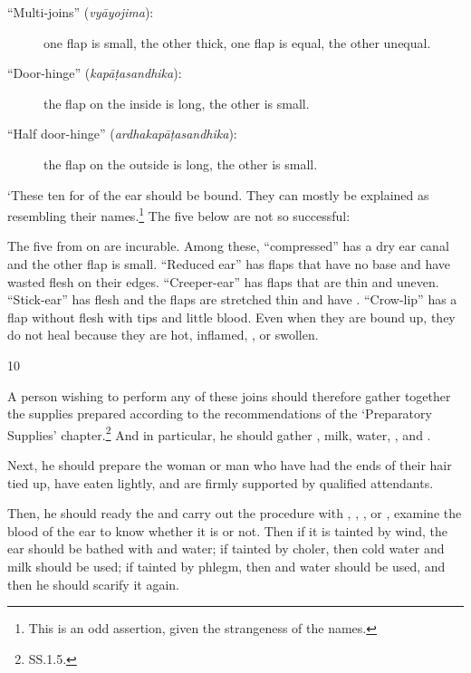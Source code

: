 \begin{translation}
\begin{description}
        \item[\mdseries``Multi-joins'' (\emph{vyāyojima}):]
        one flap is small, the other thick, one flap is equal, the other unequal.
        
        \item[\mdseries``Door-hinge'' (\emph{kapāṭasandhika}):]
        the flap on the inside is long, the other is small.
        
        \item[\mdseries``Half door-hinge'' (\emph{ardhakapāṭasandhika}):]
        the flap on the outside is long, the other is small.
    \end{description}
    
    `These ten  for  of the ear should be
    bound.  They can mostly be explained as resembling their names.\footnote{This
    is an odd assertion, given the strangeness of the names.}  The five below are
    not so successful:
    
    
    The five from  on are incurable.  Among these, 
    “compressed” has a dry ear canal and the other flap is small.   “Reduced ear” has 
    flaps that have no base and have wasted flesh on their edges. “Creeper-ear” has 
    flaps that are thin and uneven. “Stick-ear” has  flesh and the 
    flaps are stretched thin and have  .  “Crow-lip” 
    has a flap 
    without flesh with  tips and little blood. Even when 
    they are bound up, they do not heal because they are hot, inflamed, 
    , or swollen.
    
    \item[10]  
    
    A person wishing to perform any of these joins should therefore gather together the
    supplies prepared according to the recommendations of the `Preparatory
    Supplies' chapter.\footnote{SS.1.5.}  And in particular, he should gather
    , milk, water,
    , and .  
    
    Next, he should prepare the woman or man who have had the ends of their hair tied 
    up, have eaten lightly, and are firmly supported by qualified 
    attendants.
    
    Then, he should ready the  and carry out the procedure with
    , , , or
    , examine the blood of the ear to know whether it is 
     or not.  Then if it is tainted by wind, the ear should be
    bathed with  and water; if tainted by choler, 
    then cold water
    and milk should be used; if tainted by phlegm, then  and water
    should be used, and then he should scarify it again.
    

\end{translation}
